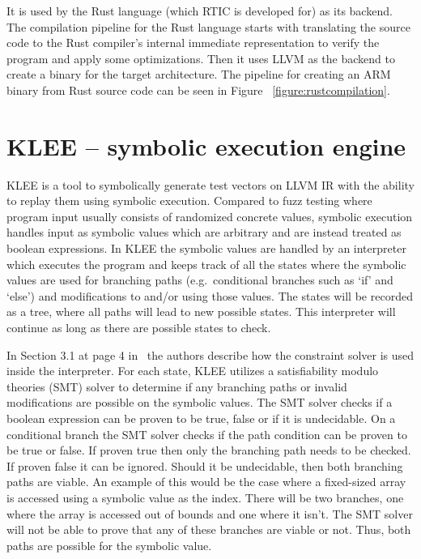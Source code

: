 It is used by the Rust language (which RTIC is developed for) as its backend.
The compilation pipeline for the Rust language starts with translating the
source code to the Rust compiler's internal immediate representation to
verify the program and apply some optimizations. Then it uses LLVM as the backend
to create a binary for the target architecture. The pipeline for creating an
ARM binary from Rust source code can be seen in Figure
~\ref{figure:rustcompilation}.


\section{KLEE -- symbolic execution engine}
KLEE\cite{kleepaper} is a tool to symbolically generate test vectors on LLVM IR with the
ability to replay them using symbolic execution. Compared to fuzz testing
where program input usually consists of randomized concrete values, symbolic
execution handles input as symbolic values which are arbitrary and are instead
treated as boolean expressions. In KLEE the symbolic values are handled by an
interpreter which executes the program and keeps track of all the states where
the symbolic values are used for branching paths (e.g.\ conditional branches
such as `if' and `else') and modifications to and/or using those values. The
states will be recorded as a tree, where all paths will lead to new possible
states.  This interpreter will continue as long as there are possible states to
check.

In Section 3.1 at page 4 in~\cite{kleepaper} the authors describe how the
constraint solver is used inside the interpreter. For each state, KLEE utilizes
a satisfiability modulo theories (SMT) solver to determine if any branching
paths or invalid modifications are possible on the symbolic values. The SMT
solver checks if a boolean expression can be proven to be true, false or if it
is undecidable. On a conditional branch the SMT solver checks if the path
condition can be proven to be true or false. If proven true then only the
branching path needs to be checked. If proven false it can be ignored. Should
it be undecidable, then both branching paths are viable. An example of this
would be the case where a fixed-sized array is accessed using a symbolic value
as the index. There will be two branches, one where the array is accessed out
of bounds and one where it isn't. The SMT solver will not be able to prove that
any of these branches are viable or not. Thus, both paths are possible for the
symbolic value.

